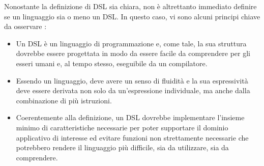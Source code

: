 \documentclass[12pt,a4paper,openright,twoside]{book}
\begin{document}
Nonostante la definizione di \ac{DSL} sia chiara, non è altrettanto immediato definire se un linguaggio sia o meno un \ac{DSL}. In questo caso, 
vi sono alcuni principi chiave da osservare \cite{Fowler2010}:
\begin{itemize}
    \item Un \ac{DSL} è un linguaggio di programmazione e, come tale, la sua struttura dovrebbe essere progettata in modo da essere facile da 
    comprendere per gli esseri umani e, al tempo stesso, eseguibile da un compilatore.
    \item Essendo un linguaggio, deve avere un senso di fluidità e la sua espressività deve essere derivata non solo da un’espressione 
    individuale, ma anche dalla combinazione di più istruzioni.
    \item Coerentemente alla definizione, un \ac{DSL} dovrebbe implementare l'insieme minimo di caratteristiche necessarie per poter supportare 
    il dominio applicativo di interesse ed evitare funzioni non strettamente necessarie che potrebbero rendere il linguaggio più difficile, 
    sia da utilizzare, sia da comprendere.
\end{itemize}
\end{document}
